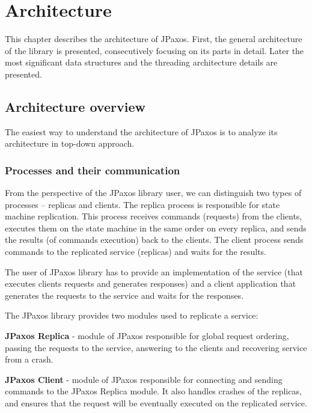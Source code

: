 \chapter{Architecture}

This chapter describes the architecture of JPaxos.
First, the general architecture of the library is presented, consecutively focusing on its parts in detail.
Later the most significant data structures and the threading architecture details are presented.

\section{Architecture overview}
\indent\par
The easiest way to understand the architecture of JPaxos is to analyze its architecture in top-down approach.

\subsection{Processes and their communication}

From the perspective of the JPaxos library user, we can distinguish two types of processes -- replicas and clients. The replica process is responsible for state machine replication. This process receives commands (requests) from the clients, executes them on the state machine in the same order on every replica, and sends the results (of commands execution) back to the clients. The client process sends commands to the replicated service (replicas) and waits for the results.

The user of JPaxos library has to provide an implementation of the service (that executes clients requests and generates responses) and a client application that generates the requests to the service and waits for the responses.

The JPaxos library provides two modules used to replicate a service:
\begin{tightList}
  \item[\textbf{JPaxos Replica}] - module of JPaxos responsible for global request ordering, passing the requests to the service, answering to the clients and recovering service from a crash.
  \item[\textbf{JPaxos Client}] - module of JPaxos responsible for connecting and sending commands to the JPaxos Replica module. It also handles crashes of the replicas, and ensures that the request will be eventually executed on the replicated service.
\end{tightList}

